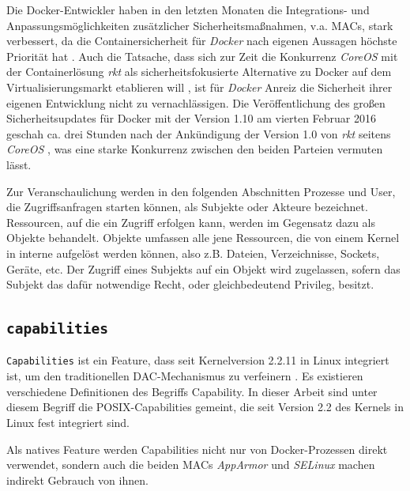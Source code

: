 \documentclass[../main.tex]{subfiles}
\begin{document}
		Die Docker-Entwickler haben in den letzten Monaten die Integrations- und Anpassungsmöglichkeiten zusätzlicher Sicherheitsmaßnahmen, v.a. MACs, stark verbessert, da die Containersicherheit für \emph{Docker} nach eigenen Aussagen höchste Priorität hat \cite{githubDockerRoadmap}\cite{githubDockerChangelog}. Auch die Tatsache, dass sich zur Zeit die Konkurrenz \emph{CoreOS} mit der Containerlösung \emph{rkt} als sicherheitsfokusierte Alternative zu Docker auf dem Virtualisierungsmarkt etablieren will \cite{coreosAnnouncementRkt10}, ist für \emph{Docker} Anreiz die Sicherheit ihrer eigenen Entwicklung nicht zu vernachlässigen. Die Veröffentlichung des großen Sicherheitsupdates für Docker mit der Version 1.10 am vierten Februar 2016 geschah ca. drei Stunden nach der Ankündigung der Version 1.0 von \emph{rkt} seitens \emph{CoreOS} \cite{hnAnnouncementDocker110}\cite{hnAnnouncementRkt10}, was eine starke Konkurrenz zwischen den beiden Parteien vermuten lässt. %

		Zur Veranschaulichung werden in den folgenden Abschnitten Prozesse und User, die Zugriffsanfragen starten können, als Subjekte oder Akteure bezeichnet. Ressourcen, auf die ein Zugriff erfolgen kann, werden im Gegensatz dazu als Objekte behandelt. Objekte umfassen alle jene Ressourcen, die von einem Kernel in interne  aufgelöst werden können, also z.B. Dateien, Verzeichnisse, Sockets, Geräte, etc. Der Zugriff eines Subjekts auf ein Objekt wird zugelassen, sofern das Subjekt das dafür notwendige Recht, oder gleichbedeutend Privileg, besitzt.



    \subsection{\texttt{capabilities}}
			\texttt{Capabilities} ist ein Feature, dass seit Kernelversion 2.2.11 in Linux integriert ist, um den traditionellen DAC-Mechanismus zu verfeinern \cite[S.42]{SELinuxApparmor}. Es existieren verschiedene Definitionen des Begriffs \glqq{}Capability\grqq{}. In dieser Arbeit sind unter diesem Begriff die POSIX-Capabilities gemeint, die seit Version 2.2 des Kernels in Linux fest integriert sind.

			Als natives Feature werden Capabilities nicht nur von Docker-Prozessen direkt verwendet, sondern auch die beiden MACs \emph{AppArmor} und \emph{SELinux} machen indirekt Gebrauch von ihnen.
\end{document}
